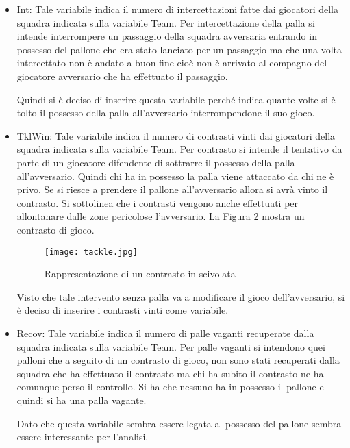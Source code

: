 \begin{itemize}
	\begin{figure}[!h]
		\begin{center}
			\texttt{[image: cross.jpg]}
			\caption{Rappresentazione di un cross} \label{fig:cross}
		\end{center}
	\end{figure}
	
	Per tale motivo si è deciso di inserire una variabile specifica per questo tipo di passaggio nell'analisi. Una rappresentazione di un cross è mostrata nella Figura \ref{fig:cross}.
	\item \textsf{Int}: Tale variabile indica il numero di intercettazioni fatte dai giocatori della squadra indicata sulla variabile \textsf{Team}. Per intercettazione della palla si intende interrompere un passaggio della squadra avversaria entrando in possesso del pallone che era stato lanciato per un passaggio ma che una volta intercettato non è andato a buon fine cioè non è arrivato al compagno del giocatore avversario che ha effettuato il passaggio. 
	
	Quindi si è deciso di inserire questa variabile perché indica quante volte si è tolto il possesso della palla all'avversario interrompendone il suo gioco.
	\item \textsf{TklWin}: Tale variabile indica il numero di contrasti vinti dai giocatori della squadra indicata sulla variabile \textsf{Team}. Per contrasto si intende il tentativo da parte di un giocatore difendente di sottrarre il possesso della palla all'avversario. Quindi chi ha in possesso la palla viene attaccato da chi ne è privo. Se si riesce a prendere il pallone all'avversario allora si avrà vinto il contrasto. Si sottolinea che i contrasti vengono anche effettuati per allontanare dalle zone pericolose l'avversario. La Figura \ref{fig:tackle} mostra un contrasto di gioco.
	
	\begin{figure}[!h]
		\begin{center}
			\texttt{[image: tackle.jpg]}
			\caption{Rappresentazione di un contrasto in scivolata} \label{fig:tackle}
		\end{center}
	\end{figure}
	
	Visto che tale intervento senza palla va a modificare il gioco dell'avversario, si è deciso di inserire i contrasti vinti come variabile. 
	
	\item \textsf{Recov}: Tale variabile indica il numero di palle vaganti recuperate dalla squadra indicata sulla variabile \textsf{Team}. Per palle vaganti si intendono quei palloni che a seguito di un contrasto di gioco, non sono stati recuperati dalla squadra che ha effettuato il contrasto ma chi ha subito il contrasto ne ha comunque perso il controllo. Si ha che nessuno ha in possesso il pallone e quindi si ha una palla vagante.
	
	Dato che questa variabile sembra essere legata al possesso del pallone sembra essere interessante per l'analisi.
	
\end{itemize}
